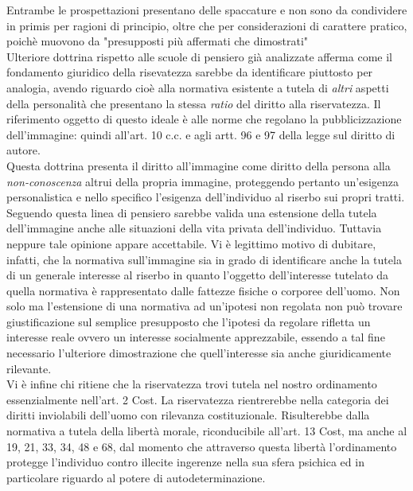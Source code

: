 Entrambe le prospettazioni presentano delle spaccature e non sono da condividere in primis per ragioni di principio, oltre che per considerazioni di carattere pratico, poichè muovono da "presupposti più affermati che dimostrati"
\\Ulteriore dottrina rispetto alle scuole di pensiero già analizzate afferma come il fondamento giuridico della risevatezza sarebbe da identificare piuttosto per analogia, avendo riguardo cioè alla normativa esistente a tutela di \textit{altri} aspetti della personalità che presentano la stessa \textit{ratio} del diritto alla riservatezza.%
Il riferimento oggetto di questo ideale è alle norme che regolano la pubblicizzazione dell'immagine: quindi all'art. 10 c.c. e agli artt. 96 e 97 della legge sul diritto di autore.
\\Questa dottrina presenta il diritto all'immagine come diritto della persona alla \textit{non-conoscenza} altrui della propria immagine, proteggendo pertanto un'esigenza personalistica e nello specifico l'esigenza dell'individuo al riserbo sui propri tratti.
Seguendo questa linea di pensiero sarebbe valida una estensione della tutela dell'immagine anche alle situazioni della vita privata dell'individuo.
Tuttavia neppure tale opinione appare accettabile. 
Vi è legittimo motivo di dubitare, infatti, che la normativa sull'immagine sia in grado di identificare anche la tutela di un generale interesse al riserbo in quanto l'oggetto dell'interesse tutelato da quella normativa è rappresentato dalle fattezze fisiche o corporee dell'uomo.
Non solo ma l'estensione di una normativa ad un'ipotesi non regolata non può trovare giustificazione sul semplice presupposto che l'ipotesi da regolare rifletta un interesse reale ovvero un interesse socialmente apprezzabile, essendo a tal fine necessario l'ulteriore dimostrazione che quell'interesse sia anche giuridicamente rilevante.
\\Vi è infine chi ritiene che la riservatezza trovi tutela nel nostro ordinamento essenzialmente nell'art. 2 Cost. La riservatezza rientrerebbe nella categoria dei diritti inviolabili dell'uomo con rilevanza costituzionale.
Risulterebbe dalla normativa a tutela della libertà morale, riconducibile all'art. 13 Cost, ma anche al 19, 21, 33, 34, 48 e 68, dal momento che attraverso questa libertà l'ordinamento protegge l'individuo contro illecite ingerenze nella sua sfera psichica ed in particolare riguardo al potere di autodeterminazione.
